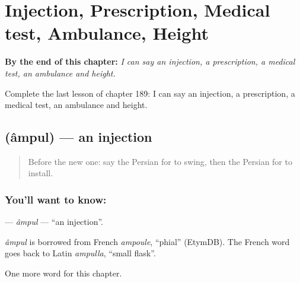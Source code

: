 
\chapter{Injection, Prescription, Medical test, Ambulance, Height}
\label{ch:fa-injection-prescription-medical-test-ambulance-height}

\begin{chapteropening}
\textbf{By the end of this chapter:} \emph{I can say an injection, a prescription, a medical test, an ambulance and height.}

Complete the last lesson of chapter 189: I can say an injection, a prescription, a medical test, an ambulance and height.
\end{chapteropening}

\section[\texorpdfstring{\fa{آمپول} (âmpul)}{آمپول (âmpul)}]{ (âmpul) — an injection}

\label{lesson:FA-C189-ampul}



\begin{quote}
Before the new one: say the Persian for to swing, then the Persian for to install.
\end{quote}

\subsection*{You'll want to know: }
\textbf{} — \emph{âmpul} — \textquotedblleft{}an injection\textquotedblright{}.

\begin{cousinweb}
\emph{âmpul} is borrowed from French \emph{ampoule}, \textquotedblleft{}phial\textquotedblright{} (EtymDB). The French word goes back to Latin \emph{ampulla}, \textquotedblleft{}small flask\textquotedblright{}.
\end{cousinweb}

\begin{grammarlens}[title={What you've built}]
One more word for this chapter.
\end{grammarlens}

